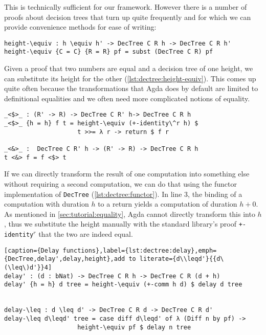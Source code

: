 This is technically sufficient for our framework. However there is a number of proofs about decision trees that turn up quite frequently and for which we can provide convenience methods for ease of writing:

\noindent\begin{minipage}{\linewidth}
\begin{lstlisting}[caption={Height substitution},label={lst:dectree:height-equiv},emph={height,DecTree}]
height-\equiv : h \equiv h' -> DecTree C R h -> DecTree C R h'
height-\equiv {C = C} {R = R} pf = subst (DecTree C R) pf
\end{lstlisting}
\end{minipage}

Given a proof that two numbers are equal and a decision tree of one height, we can substitute its height for the other (\autoref{lst:dectree:height-equiv}). This comes up quite often because the transformations that Agda does by default are limited to definitional equalities and we often need more complicated notions of equality.

\begin{lstlisting}[caption={Functor implementation for DecTree},label={lst:dectree:functor},emph={DecTree,return,height}]
_<$>_ : (R' -> R) -> DecTree C R' h-> DecTree C R h
_<$>_ {h = h} f t = height-\equiv (+-identity\^r h) $
                    t >>= λ r -> return $ f r

_<&>_ :  DecTree C R' h -> (R' -> R) -> DecTree C R h
t <&> f = f <$> t
\end{lstlisting}

If we can directly transform the result of one computation into something else without requiring a second computation, we can do that using the functor implementation of \texttt{DecTree} (\autoref{lst:dectree:functor}). In line 3, the binding of a computation with duration $h$ to a return yields a computation of duration $h + 0$. As mentioned in \autoref{sec:tutorial:equality}, Agda cannot directly transform this into $h$, thus we substitute the height manually with the standard library's proof \texttt{+-identity$^r$} that the two are indeed equal.

\begin{lstlisting}[caption={Delay functions},label={lst:dectree:delay},emph={DecTree,delay',delay,height},add to literate={d\\leqd'}{{d\(\leq\)d'}}4]
delay' : (d : bNat) -> DecTree C R h -> DecTree C R (d + h)
delay' {h = h} d tree = height-\equiv (+-comm h d) $ delay d tree


delay-\leq : d \leq d' -> DecTree C R d -> DecTree C R d'
delay-\leq d\leqd' tree = case diff d\leqd' of λ (Diff n by pf) ->
                    height-\equiv pf $ delay n tree
\end{lstlisting}


